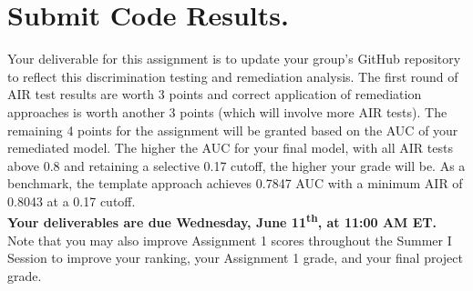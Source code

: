 \documentclass[fleqn]{article}
\begin{document}
\section{Submit Code Results.}

Your deliverable for this assignment is to update your group's GitHub repository to reflect this discrimination testing and remediation analysis. The first round of AIR test results are worth 3 points and correct application of remediation approaches is worth another 3 points (which will involve more AIR tests). The remaining 4 points for the assignment will be granted based on the AUC of your remediated model. The higher the AUC for your final model, with all AIR tests above 0.8 and retaining a selective 0.17 cutoff, the higher your grade will be. As a benchmark, the template approach achieves 0.7847 AUC with a minimum AIR of 0.8043 at a 0.17 cutoff.\\

\noindent \textbf{Your deliverables are due Wednesday, June 11\textsuperscript{th}, at 11:00 AM ET.}\\

\noindent Note that you may also improve Assignment 1 scores throughout the Summer I Session to improve your ranking, your Assignment 1 grade, and your final project grade.
\end{document}
